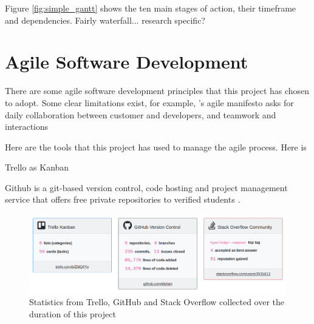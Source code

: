 Figure \ref{fig:simple_gantt} shows the ten main stages of action, their timeframe and dependencies.
Fairly waterfall... research specific?

\section{Agile Software Development}


There are some agile software development principles that this project has chosen to adopt. 
Some clear limitations exist, for example, \citet{beck2001agile}'s agile manifesto asks for 
daily collaboration between customer and developers, and teamwork and interactions

Here are the tools that this project has used to manage the agile process. Here is 

Trello as Kanban

Github is a git-based version control, code hosting and project management service that offers free 
private repositories to verified students \citep{github2018education}.

\begin{figure}[!hb] 
    \centering    
    \includegraphics[width=1.0\textwidth]{platforms_stats}
    \caption[Project Management Statistics]
        {Statistics from Trello, GitHub and Stack Overflow collected over the duration of this project} 
    \label{fig:platforms_stats}
\end{figure}


